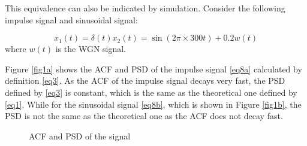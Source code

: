\documentclass[10pt]{article}
\begin{document}
This equivalence can also be indicated by simulation. Consider the 
following impulse signal and sinusoidal signal:

\begin{subequations}
	\begin{equation}
		x_1(t)=\delta (t) \label{eq8a}
	\end{equation}
	\begin{equation}
		x_2(t)=\sin (2 \pi \times 300t) + 0.2 w(t) \label{eq8b}
	\end{equation}
\end{subequations}
where $w(t)$ is the WGN signal.

Figure \ref{fig1a} shows the ACF and PSD of the impulse signal \eqref{eq8a} calculated by 
definition \eqref{eq3}. As the ACF of the impulse signal decays very fast, 
the PSD defined by \eqref{eq3} is constant, which is the same as the 
theoretical one defined by \eqref{eq1}. While for the sinusoidal signal \eqref{eq8b}, which 
is shown in Figure \ref{fig1b}, the PSD is not the same as the theoretical one 
as the ACF does not decay fast. 

\begin{figure}[htbp]
    \centering
    \caption{ACF and PSD of the signal}
    \label{fig3}
\end{figure}
\end{document}
